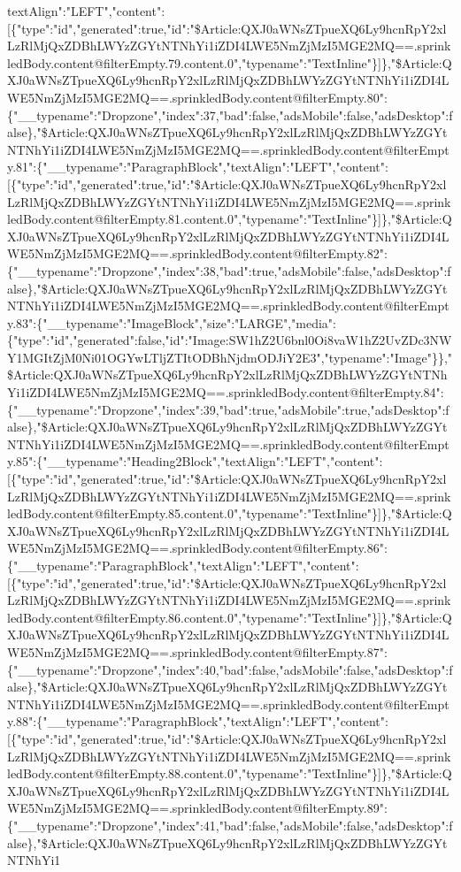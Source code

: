textAlign":"LEFT","content":{[}\{"type":"id","generated":true,"id":"\$Article:QXJ0aWNsZTpueXQ6Ly9hcnRpY2xlLzRlMjQxZDBhLWYzZGYtNTNhYi1iZDI4LWE5NmZjMzI5MGE2MQ==.sprinkledBody.content@filterEmpty.79.content.0","typename":"TextInline"\}{]}\},"\$Article:QXJ0aWNsZTpueXQ6Ly9hcnRpY2xlLzRlMjQxZDBhLWYzZGYtNTNhYi1iZDI4LWE5NmZjMzI5MGE2MQ==.sprinkledBody.content@filterEmpty.80":\{"\_\_typename":"Dropzone","index":37,"bad":false,"adsMobile":false,"adsDesktop":false\},"\$Article:QXJ0aWNsZTpueXQ6Ly9hcnRpY2xlLzRlMjQxZDBhLWYzZGYtNTNhYi1iZDI4LWE5NmZjMzI5MGE2MQ==.sprinkledBody.content@filterEmpty.81":\{"\_\_typename":"ParagraphBlock","textAlign":"LEFT","content":{[}\{"type":"id","generated":true,"id":"\$Article:QXJ0aWNsZTpueXQ6Ly9hcnRpY2xlLzRlMjQxZDBhLWYzZGYtNTNhYi1iZDI4LWE5NmZjMzI5MGE2MQ==.sprinkledBody.content@filterEmpty.81.content.0","typename":"TextInline"\}{]}\},"\$Article:QXJ0aWNsZTpueXQ6Ly9hcnRpY2xlLzRlMjQxZDBhLWYzZGYtNTNhYi1iZDI4LWE5NmZjMzI5MGE2MQ==.sprinkledBody.content@filterEmpty.82":\{"\_\_typename":"Dropzone","index":38,"bad":true,"adsMobile":false,"adsDesktop":false\},"\$Article:QXJ0aWNsZTpueXQ6Ly9hcnRpY2xlLzRlMjQxZDBhLWYzZGYtNTNhYi1iZDI4LWE5NmZjMzI5MGE2MQ==.sprinkledBody.content@filterEmpty.83":\{"\_\_typename":"ImageBlock","size":"LARGE","media":\{"type":"id","generated":false,"id":"Image:SW1hZ2U6bnl0Oi8vaW1hZ2UvZDc3NWY1MGItZjM0Ni01OGYwLTljZTItODBhNjdmODJiY2E3","typename":"Image"\}\},"\$Article:QXJ0aWNsZTpueXQ6Ly9hcnRpY2xlLzRlMjQxZDBhLWYzZGYtNTNhYi1iZDI4LWE5NmZjMzI5MGE2MQ==.sprinkledBody.content@filterEmpty.84":\{"\_\_typename":"Dropzone","index":39,"bad":true,"adsMobile":true,"adsDesktop":false\},"\$Article:QXJ0aWNsZTpueXQ6Ly9hcnRpY2xlLzRlMjQxZDBhLWYzZGYtNTNhYi1iZDI4LWE5NmZjMzI5MGE2MQ==.sprinkledBody.content@filterEmpty.85":\{"\_\_typename":"Heading2Block","textAlign":"LEFT","content":{[}\{"type":"id","generated":true,"id":"\$Article:QXJ0aWNsZTpueXQ6Ly9hcnRpY2xlLzRlMjQxZDBhLWYzZGYtNTNhYi1iZDI4LWE5NmZjMzI5MGE2MQ==.sprinkledBody.content@filterEmpty.85.content.0","typename":"TextInline"\}{]}\},"\$Article:QXJ0aWNsZTpueXQ6Ly9hcnRpY2xlLzRlMjQxZDBhLWYzZGYtNTNhYi1iZDI4LWE5NmZjMzI5MGE2MQ==.sprinkledBody.content@filterEmpty.86":\{"\_\_typename":"ParagraphBlock","textAlign":"LEFT","content":{[}\{"type":"id","generated":true,"id":"\$Article:QXJ0aWNsZTpueXQ6Ly9hcnRpY2xlLzRlMjQxZDBhLWYzZGYtNTNhYi1iZDI4LWE5NmZjMzI5MGE2MQ==.sprinkledBody.content@filterEmpty.86.content.0","typename":"TextInline"\}{]}\},"\$Article:QXJ0aWNsZTpueXQ6Ly9hcnRpY2xlLzRlMjQxZDBhLWYzZGYtNTNhYi1iZDI4LWE5NmZjMzI5MGE2MQ==.sprinkledBody.content@filterEmpty.87":\{"\_\_typename":"Dropzone","index":40,"bad":false,"adsMobile":false,"adsDesktop":false\},"\$Article:QXJ0aWNsZTpueXQ6Ly9hcnRpY2xlLzRlMjQxZDBhLWYzZGYtNTNhYi1iZDI4LWE5NmZjMzI5MGE2MQ==.sprinkledBody.content@filterEmpty.88":\{"\_\_typename":"ParagraphBlock","textAlign":"LEFT","content":{[}\{"type":"id","generated":true,"id":"\$Article:QXJ0aWNsZTpueXQ6Ly9hcnRpY2xlLzRlMjQxZDBhLWYzZGYtNTNhYi1iZDI4LWE5NmZjMzI5MGE2MQ==.sprinkledBody.content@filterEmpty.88.content.0","typename":"TextInline"\}{]}\},"\$Article:QXJ0aWNsZTpueXQ6Ly9hcnRpY2xlLzRlMjQxZDBhLWYzZGYtNTNhYi1iZDI4LWE5NmZjMzI5MGE2MQ==.sprinkledBody.content@filterEmpty.89":\{"\_\_typename":"Dropzone","index":41,"bad":false,"adsMobile":false,"adsDesktop":false\},"\$Article:QXJ0aWNsZTpueXQ6Ly9hcnRpY2xlLzRlMjQxZDBhLWYzZGYtNTNhYi1